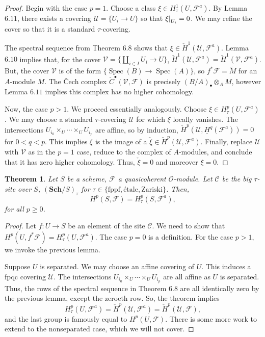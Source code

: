 \documentclass{amsart}
\newcommand{\Sch}{\mathbf{Sch}}
\DeclareMathOperator{\Spec}{Spec}
\newtheorem{theorem}{Theorem}[section]
\theoremstyle{definition}
\theoremstyle{remark}
\newcommand\restr[2]{{%
  \left.\kern-\nulldelimiterspace %
  #1 %
  \vphantom{|} %
  \right|_{#2} %
  }}
\begin{document}
\begin{proof}
    Begin with the case $p=1$. Choose a class $\xi \in H^1_\tau(U,
    \mathcal{F}^a)$. By Lemma $6.11$, there exists a covering $\mathcal{U} =
    \{U_i \to U\}$ so that $\restr{\xi}{U_i} = 0$. We may refine the cover so
    that it is a standard $\tau$-covering.

    The spectral sequence from Theorem $6.8$ shows that $\xi \in
    \check{H}^1(\mathcal{U}, \mathcal{F}^a)$. Lemma $6.10$ implies that, for the
    cover $\mathcal{V} = \{\coprod_{i \in I} U_i \to U\}$,
    $\check{H}^1(\mathcal{U}, \mathcal{F}^a) = \check{H}^1(\mathcal{V},
    \mathcal{F}^a)$. But, the cover $\mathcal{V}$ is of the form $\{\Spec(B) \to
    \Spec(A)\}$, so $f^{\ast}\mathcal{F} = \widetilde{M}$ for an $A$-module $M$.
    The \v{C}ech complex $\check{C}^\bullet(\mathcal{V}, \mathcal{F})$ is
    precisely $(B/A)_{\bullet} \otimes_A M$, however Lemma $6.11$ implies this
    complex has no higher cohomology.

    Now, the case $p>1$. We proceed essentially analogously. Choose $\xi \in
    H^p_\tau(U, \mathcal{F}^a)$. We may choose a standard $\tau$-covering
    $\mathcal{U}$ for which $\xi$ locally vanishes. The intersections $U_{i_0}
    \times_U \cdots \times_U U_{i_p}$ are affine, so by induction,
    $\check{H}^p(\mathcal{U}, \underline{H}^q(\mathcal{F}^a)) = 0$ for $0 < q <
    p$. This implies $\xi$ is the image of a $\check{\xi} \in
    \check{H}^p(\mathcal{U}, \mathcal{F}^a)$. Finally, replace $\mathcal{U}$
    with $\mathcal{V}$ as in the $p=1$ case, reduce to the complex of
    $A$-modules, and conclude that it has zero higher cohomology. Thus,
    $\check{\xi} = 0$ and moreover $\xi = 0$.
\end{proof}

\begin{theorem}
    Let $S$ be a scheme, $\mathcal{F}$ a quasicoherent $\mathcal{O}$-module. Let
    $\mathcal{C}$ be the big $\tau$-site over $S$, $(\Sch/S)_\tau$ for $\tau \in
    \{\text{fppf}, \text{\'etale}, \text{Zariski}\}$. Then,
    \[
        H^p(S, \mathcal{F}) = H^p_{\tau}(S, \mathcal{F}^a),
    \]
    for all $p \geq 0$.
\end{theorem}

\begin{proof}
    Let $f : U \to S$ be an element of the site $\mathcal{C}$. We need to show
    that $H^p(U, f^{\ast}\mathcal{F}) = H_{\tau}^p(U, \mathcal{F}^a)$. The case
    $p=0$ is a definition. For the case $p>1$, we invoke the previous lemma.

    Suppose $U$ is separated. We may choose an affine covering of $U$. This
    induces a fpqc covering $\mathcal{U}$. The intersections $U_{i_0} \times_U
    \cdots \times_U U_{i_p}$ are all affine as $U$ is separated. Thus, the rows
    of the spectral sequence in Theorem $6.8$ are all identically zero by the
    previous lemma, except the zeroeth row. So, the theorem implies
    \[
        H^p_\tau(U, \mathcal{F}^a) = \check{H}^p(\mathcal{U}, \mathcal{F}^a)
        = \check{H}^p(\mathcal{U}, \mathcal{F}),
    \]
    and the last group is famously equal to $H^p(U, \mathcal{F})$. There is some
    more work to extend to the nonseparated case, which we will not cover.
\end{proof}
\end{document}
